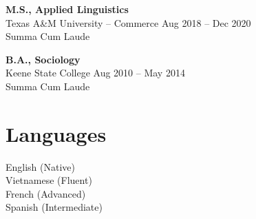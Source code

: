 \documentclass[11pt]{article}
\begin{document}
\vspace{6pt}

\textbf{M.S., Applied Linguistics} \\
Texas A\&M University -- Commerce \hfill Aug 2018 -- Dec 2020 \\
Summa Cum Laude

\vspace{6pt}

\textbf{B.A., Sociology} \\
Keene State College \hfill Aug 2010 -- May 2014 \\
Summa Cum Laude

\section*{Languages}

English (Native) \\
Vietnamese (Fluent) \\
French (Advanced) \\
Spanish (Intermediate)
\end{document}
